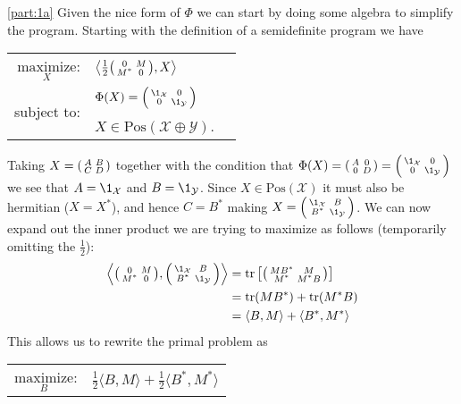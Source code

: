 \documentclass[boxes,pages,color=SeaGreen]{homework}
\newcommand{\X}{\mathcal{X}}
\newcommand{\Y}{\mathcal{Y}}
\newcommand{\Pos}{\mathrm{Pos}}
\begin{document}
\begin{solution}
    \ref{part:1a}
    Given the nice form of $\Phi$ we can start by doing some algebra to simplify the program.
    Starting with the definition of a semidefinite program we have
    \begin{center}
        \begin{tabular}{rl}
            $\underset{X}{\text{maximize}}$: & $\left\langle \frac{1}{2}\smqty(0 & M \\ M^* & 0), X\right\rangle$ \\ \cmidrule(lr{1em}){2-2}
            \multirow{2}{*}{subject to:}     & $\Phi(X) = \smqty(\1_\X           & 0 \\ 0 & \1_\Y)$                         \\
                                             & $X\in\Pos(\X\oplus\Y)$.
        \end{tabular}
    \end{center}
    Taking $X = \smqty(A & B \\ C & D)$ together with the condition that $\Phi(X) = \smqty(A & 0 \\ 0 & D) = \smqty(\1_\X & 0 \\ 0 & \1_\Y)$ we see that $A = \1_\X$ and $B = \1_\Y$.
    Since $X\in\Pos(\X)$ it must also be hermitian ($X = X^*$), and hence $C = B^*$ making $X = \smqty(\1_\X & B \\ B^* & \1_\Y)$.
    We can now expand out the inner product we are trying to maximize as follows (temporarily omitting the $\frac{1}{2}$):
    \begin{align*}
        \left\langle\smqty(0 & M                                               \\ M^* & 0), \smqty(\1_\X & B \\ B^* & \1_\Y)\right\rangle & = \tr\qty[\smqty(MB^* & M \\ M^* & M^*B)] \\
                             & = \tr(MB^*) + \tr(M^*B)                         \\
                             & = \langle B, M\rangle + \langle B^*, M^*\rangle
    \end{align*}
    This allows us to rewrite the primal problem as
    \begin{center}
        \begin{tabular}{rl}
            $\underset{B}{\text{maximize}}$: & $\frac{1}{2}\langle B, M\rangle + \frac{1}{2}\langle B^*, M^*\rangle$     \\ \cmidrule(lr{1em}){2-2}

\end{tabular}
\end{center}
\end{solution}
\end{document}
